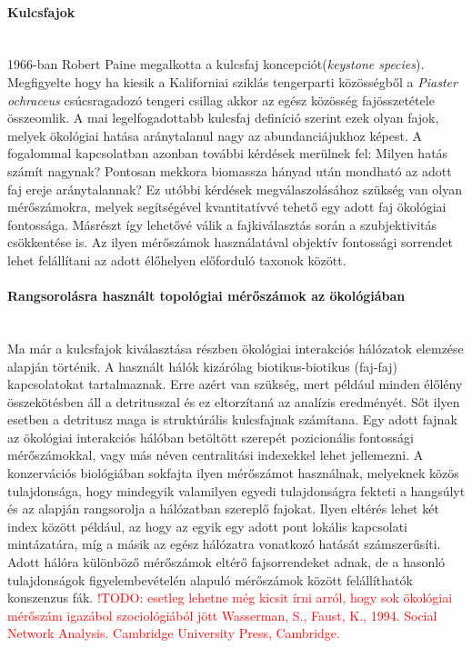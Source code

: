 \documentclass[a4paper,12pt]{article}
\begin{document}
	 \paragraph{Kulcsfajok} \mbox{}\\ %
	 1966-ban Robert Paine megalkotta a kulcsfaj koncepciót(\textit{keystone species}). Megfigyelte hogy ha kiesik a Kaliforniai sziklás tengerparti közösségből a \textit{Piaster ochraceus} csúcsragadozó tengeri csillag akkor az egész közösség fajösszetétele összeomlik. A mai legelfogadottabb kulcsfaj definíció szerint ezek olyan fajok, melyek ökológiai hatása aránytalanul nagy az abundanciájukhoz képest. A fogalommal kapcsolatban azonban további kérdések merülnek fel: Milyen hatás számít nagynak? Pontosan mekkora biomassza hányad után mondható az adott faj ereje aránytalannak? \cite{new_zeland} Ez utóbbi kérdések megválaszolásához szükség van olyan mérőszámokra, melyek segítségével kvantitatívvé tehető egy adott faj ökológiai fontossága. Másrészt így lehetővé válik a fajkiválasztás során a szubjektivitás csökkentése is. Az ilyen mérőszámok használatával objektív fontossági sorrendet lehet felállítani az adott élőhelyen előforduló taxonok között. \cite{jordan_comparison} 
	 
	 \paragraph{Rangsorolásra használt topológiai mérőszámok az ökológiában} \mbox{}\\
	 Ma már a kulcsfajok kiválasztása részben ökológiai interakciós hálózatok elemzése alapján történik. A használt hálók kizárólag biotikus-biotikus (faj-faj) kapcsolatokat tartalmaznak. Erre azért van szükség, mert például minden élőlény összekötésben áll a detritusszal és ez eltorzítaná az analízis eredményét. Sőt ilyen esetben a detritusz maga is struktúrális kulcsfajnak számítana. Egy adott fajnak az ökológiai interakciós hálóban betöltött szerepét pozicionális fontossági mérőszámokkal, vagy más néven centralitási indexekkel lehet jellemezni. A konzervációs biológiában sokfajta ilyen mérőszámot használnak, melyeknek közös tulajdonsága, hogy mindegyik valamilyen egyedi tulajdonságra fekteti a hangsúlyt és az alapján rangsorolja a hálózatban szereplő fajokat. Ilyen eltérés lehet két index között például, az hogy az egyik egy adott pont lokális kapcsolati mintázatára, míg a másik az egész hálózatra vonatkozó hatását számszerűsíti. Adott hálóra különböző mérőszámok eltérő fajsorrendeket adnak, de a hasonló tulajdonságok figyelembevételén alapuló mérőszámok között felállíthatók konszenzus fák. \cite{jordan_comparison} \textcolor{red}{ !TODO: esetleg lehetne még kicsit írni arról, hogy sok ökológiai mérőszám igazábol szociológiából jött \textrightarrow  Wasserman, S., Faust, K., 1994. Social Network Analysis. Cambridge University Press,
	 Cambridge. }
	 
\end{document}
